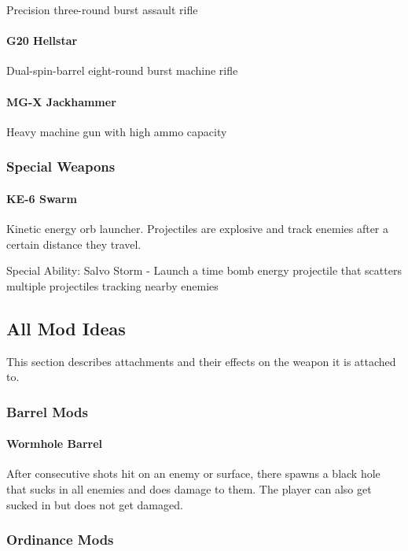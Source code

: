 \documentclass[../Main.tex]{subfiles}
\begin{document}
Precision three-round burst assault rifle

\paragraph{G20 Hellstar}

Dual-spin-barrel eight-round burst machine rifle

\paragraph{MG-X Jackhammer}

Heavy machine gun with high ammo capacity

\subsubsection{Special Weapons}

\paragraph{KE-6 Swarm}

Kinetic energy orb launcher. Projectiles are explosive and track enemies after a certain distance they travel. 

Special Ability: Salvo Storm - Launch a time bomb energy projectile that scatters multiple projectiles tracking nearby enemies

\subsection{All Mod Ideas}

This section describes attachments and their effects on the weapon it is attached to.

\subsubsection{Barrel Mods}

\paragraph{Wormhole Barrel}

After consecutive shots hit on an enemy or surface, there spawns a black hole that sucks in all enemies and does damage to them. The player can also get sucked in but does not get damaged. 

\subsubsection{Ordinance Mods}
\end{document}
